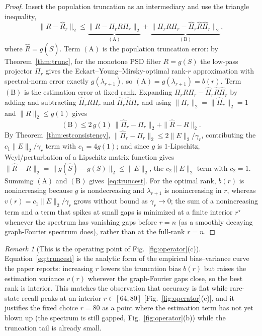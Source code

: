 \documentclass[aps,prresearch,reprint,amsmath,amssymb,nofootinbib,superscriptaddress,floatfix]{revtex4-2}
\theoremstyle{definition}
\theoremstyle{remark}
\newtheorem{remark}[theorem]{Remark}
\theoremstyle{plain}
\begin{document}
\begin{proof}
Insert the population truncation as an intermediary and use the triangle inequality,
\begin{equation}
\|R-\widehat R_r\|_2\le\underbrace{\|R-\Pi_rR\Pi_r\|_2}_{(\mathrm A)}
+\underbrace{\|\Pi_rR\Pi_r-\widehat\Pi_r\widehat R\widehat\Pi_r\|_2}_{(\mathrm B)},
\end{equation}
where $\widehat R=g(\widehat S)$. Term $(\mathrm A)$ is the population truncation error: by
Theorem~\ref{thm:trunc}, for the monotone PSD filter $R=g(S)$ the low-pass projector $\Pi_r$ gives the
Eckart--Young--Mirsky-optimal rank-$r$ approximation with spectral-norm error exactly $g(\lambda_{r+1})$,
so $(\mathrm A)=g(\lambda_{r+1})=b(r)$. Term $(\mathrm B)$ is the estimation error at fixed rank. Expanding
$\Pi_rR\Pi_r-\widehat\Pi_r\widehat R\widehat\Pi_r$ by adding and subtracting
$\widehat\Pi_rR\Pi_r$ and $\widehat\Pi_r\widehat R\Pi_r$ and using $\|\Pi_r\|_2=\|\widehat\Pi_r\|_2=1$ and
$\|R\|_2\le g(1)$ gives
\begin{equation}
(\mathrm B)\le 2\,g(1)\,\|\widehat\Pi_r-\Pi_r\|_2+\|\widehat R-R\|_2 .
\end{equation}
By Theorem~\ref{thm:estconsistency}, $\|\widehat\Pi_r-\Pi_r\|_2\le2\|E\|_2/\gamma_r$, contributing the
$c_1\|E\|_2/\gamma_r$ term with $c_1=4g(1)$; and since $g$ is $1$-Lipschitz, Weyl/perturbation of a Lipschitz
matrix function gives $\|\widehat R-R\|_2=\|g(\widehat S)-g(S)\|_2\le\|E\|_2$, the $c_2\|E\|_2$ term with
$c_2=1$. Summing $(\mathrm A)$ and $(\mathrm B)$ gives~\eqref{eq:truncest}. For the optimal rank, $b(r)$ is
nonincreasing because $g$ is nondecreasing and $\lambda_{r+1}$ is nonincreasing in $r$, whereas
$v(r)=c_1\|E\|_2/\gamma_r$ grows without bound as $\gamma_r\to0$; the sum of a nonincreasing term and a term
that spikes at small gaps is minimized at a finite interior $r^\star$ whenever the spectrum has vanishing
gaps before $r=n$ (as a smoothly decaying graph-Fourier spectrum does), rather than at the full-rank
$r=n$.
\end{proof}

\begin{remark}[This is the operating point of Fig.~\ref{fig:operator}(c)]
\label{rem:operating}
Equation~\eqref{eq:truncest} is the analytic form of the empirical bias--variance curve the paper reports:
increasing $r$ lowers the truncation bias $b(r)$ but raises the estimation variance $v(r)$ wherever the
graph-Fourier gaps close, so the best rank is interior. This matches the observation that accuracy is flat
while rare-state recall peaks at an interior $r\in[64,80]$ [Fig.~\ref{fig:operator}(c)], and it justifies the
fixed choice $r=80$ as a point where the estimation term has not yet blown up (the spectrum is still gapped,
Fig.~\ref{fig:operator}(b)) while the truncation tail is already small.
\end{remark}
\end{document}
